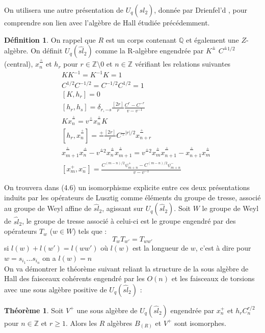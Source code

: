 \documentclass[12pt]{article}
\theoremstyle{definition}
\newtheorem{theo}{Théorème}[section]
\newtheorem{Def}{Définition}[section]
\begin{document}
On utilisera une autre présentation de $U_q(\widehat{sl}_{2})$, donnée par Drienfel'd \cite{Drienf1},  pour comprendre son lien avec l'algèbre de Hall étudiée précédemment. 
\begin{Def}On rappel que $R$ est un corps contenant $\mathbb{Q}$ et également une $Z$-algèbre. On définit $U_q(\widehat{sl}_{2})$ comme la R-algèbre engendrée par $K^{\frac{+}{}}$ $C^{\frac{+}{}1/2}$ (central), $x_n^{\frac{+}{}}$ et $h_r$ pour $r\in\mathbb{Z}\setminus{0}$ et $n\in\mathbb{Z}$ vérifiant les relations suivantes \begin{align}
& KK^{-1}=K^{-1}K=1\\
& C^{1/2}C^{-1/2}=C^{-1/2}C^{1/2}=1\\
& [K,h_r]=0\\
&[h_r,h_s]=\delta_{r,-s}\frac{[2r]}{r}\frac{C^r-C^{-r}}{v-v^{-1}}\\
&Kx_n^{\frac{+}{}}=v^{\frac{+}{}}x_n^{\frac{+}{}}K\\\
&[h_r,x_n^{\frac{+}{}}]=\frac{+}{}\frac{[2r]}{r}C^{\frac{}{+}\vert r\vert /2}x_{n+r}^{\frac{+}{}}\\\label{comx}
&x_{m+1}^{\frac{+}{}}x_{n}^{\frac{+}{}}-v^{\frac{+}{}2}x_{n}^{\frac{+}{}}x_{m+1}^{\frac{+}{}}=v^{\frac{+}{}2}x_{m}^{\frac{+}{}}x_{n+1}^{\frac{+}{}}-x_{n+1}^{\frac{+}{}}x_{m}^{\frac{+}{}}\\
&[x_m^{+},x_n^{-}]=\frac{C^{(m-n)/2}\psi_{m+n}^+-C^{(m-n)/2}\psi_{m+n}^-}{v-v^{-1}}
\end{align}
\end{Def}
On trouvera dans \cite{Beck} (4.6) un isomorphisme explicite entre ces deux présentations induits par les opérateurs de Lusztig comme éléments du groupe de tresse, associé au groupe de Weyl affine de $\widehat{sl}_2$, agissant sur $U_q(\widehat{sl}_2)$. Soit $W$ le groupe de Weyl de $\widehat{sl}_2$, le groupe de tresse associé à celui-ci est le groupe engendré par des opérateurs $T_{w}$ ($w\in W$) tels que :
$$T_wT_{w'}=T_{ww'}$$ si $l(w)+l(w')=l(ww')$ où $l(w)$ est la longueur de $w$, c'est à dire pour $w=s_{i_1}...s_{i_n}$ on a $l(w)=n$\\
On va  démontrer le théorème suivant reliant la structure de la sous algèbre de Hall des faisceaux cohérents engendré par les $O(n)$ et les faisceaux de torsions avec une sous algèbre positive de  $U_q(\widehat{sl}_{2})$ : \begin{theo}\label{isofinal} Soit $V^+$ une sous algèbre de  $U_q(\widehat{sl}_{2})$ engendrée par $x_n^+$ et $h_rC_n^{r/2}$ pour $n\in\mathbb{Z}$ et $r\geqslant 1$. Alors les $R$ algèbres $B_{(R)}$ et $V^+$ sont isomorphes.  \end{theo} 
\end{document}
